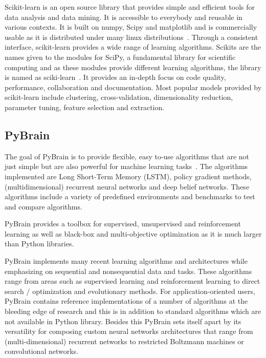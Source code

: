 Scikit-learn is an open source library that provides simple and
efficient tools for data analysis and data mining. It is accessible to
everybody and reusable in various contexts. It is built on numpy,
Scipy and matplotlib and is commercially usable as it is distributed
under many linux distributions~\cite{scik1}. Through a consistent
interface, scikit-learn provides a wide range of learning
algorithms. Scikits are the names given to the modules for SciPy, a
fundamental library for scientific computing and as these modules
provide different learning algorithms, the library is named as
sciki-learn~\cite{scik2}. It provides an in-depth focus on code
quality, performance, collaboration and documentation. Most popular
models provided by scikit-learn include clustering, cross-validation,
dimensionality reduction, parameter tuning, feature selection and
extraction.

\subsection{PyBrain}

The goal of PyBrain is to provide flexible, easy to-use algorithms
that are not just simple but are also powerful for machine learning
tasks~\cite{article-pybrain}.  The algorithms implemented are Long
Short-Term Memory (LSTM), policy gradient methods, (multidimensional)
recurrent neural networks and deep belief networks. These algorithms
include a variety of predefined environments and benchmarks to test
and compare algorithms.

    PyBrain provides a toolbox for supervised, unsupervised and
    reinforcement learning as well as black-box and multi-objective
    optimization as it is much larger than Python libraries.

    PyBrain implements many recent learning algorithms and
    architectures while emphasizing on sequential and nonsequential
    data and tasks. These algorithms range from areas such as
    supervised learning and reinforcement learning to direct search /
    optimization and evolutionary methods.  For application-oriented
    users, PyBrain contains reference implementations of a number of
    algorithms at the bleeding edge of research and this is in
    addition to standard algorithms which are not available in Python
    library. Besides this PyBrain sets itself apart by its versatility
    for composing custom neural networks architectures that range from
    (multi-dimensional) recurrent networks to restricted Boltzmann
    machines or convolutional networks.

